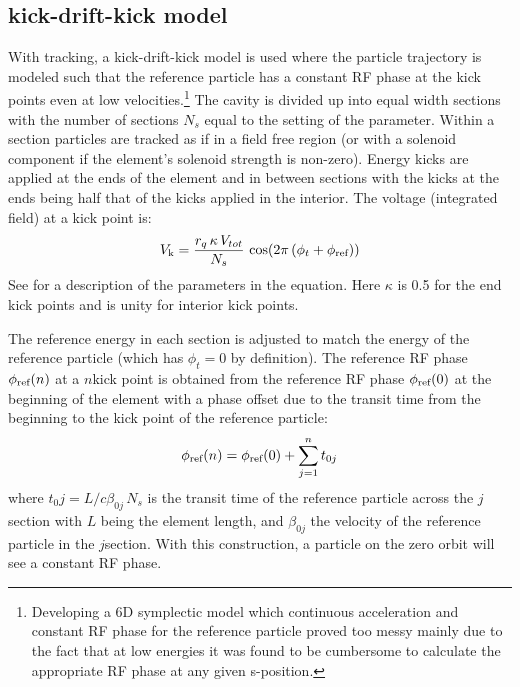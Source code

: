 \subsection{kick-drift-kick model}

With  tracking, a kick-drift-kick model is used where the particle trajectory is modeled
such that the reference particle has a constant RF phase at the kick points even at low
velocities.\footnote
  {
Developing a 6D symplectic model which continuous acceleration and constant RF phase for the
reference particle proved too messy mainly due to the fact that at low energies it was found to
be cumbersome to calculate the appropriate RF phase at any given s-position.
  }
The cavity is divided up into equal width sections with the number of sections $N_s$ equal to the
setting of the  parameter. Within a section particles are tracked as if in a field
free region (or with a solenoid component if the element's solenoid strength is non-zero). Energy
kicks are applied at the ends of the element and in between sections with the kicks at the ends
being half that of the kicks applied in the interior. The voltage (integrated field) at a kick point
is:
\begin{equation}
  V_{\text{k}} = \frac{r_q \, \kappa \, V_{tot}}{N_s} \, \cos(2 \pi \, (\phi_t + \phi_{\text{ref}}))
  \label{vkrq}
\end{equation}
See  for a description of the parameters in the equation. Here $\kappa$ is 0.5 for the end
kick points and is unity for interior kick points.

The reference energy in each section is adjusted to match the energy of the reference particle
(which has $\phi_t = 0$ by definition).  The reference RF phase $\phi_{\text{ref}}(n)$ at a $n$\Th kick
point is obtained from the reference RF phase $\phi_{\text{ref}}(0)$ at the beginning of the element with a
phase offset due to the transit time from the beginning to the kick point of the reference particle:
\begin{equation}
  \phi_{\text{ref}}(n) = \phi_{\text{ref}}(0) + \sum_{j = 1}^n t_{0j}
\end{equation}
where $t_0j = L / c \beta_{0j} \, N_s$ is the transit time of the reference particle across the
$j$\Th section with $L$ being the element length, and $\beta_{0j}$ the velocity of the reference
particle in the $j$\Th section. With this construction, a particle on the zero orbit will see a
constant RF phase.

